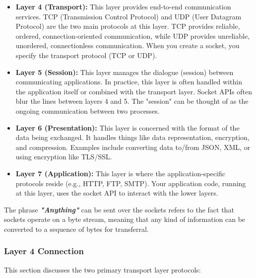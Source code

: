 \begin{itemize}
    \item \textbf{Layer 4 (Transport):}  This layer provides end-to-end communication services.  TCP (Transmission Control Protocol) and UDP (User Datagram Protocol) are the two main protocols at this layer. TCP provides reliable, ordered, connection-oriented communication, while UDP provides unreliable, unordered, connectionless communication. When you create a socket, you specify the transport protocol (TCP or UDP).
    \item \textbf{Layer 5 (Session):} This layer manages the dialogue (session) between communicating applications.  In practice, this layer is often handled within the application itself or combined with the transport layer. Socket APIs often blur the lines between layers 4 and 5.  The "session" can be thought of as the ongoing communication between two processes.
    \item \textbf{Layer 6 (Presentation):}  This layer is concerned with the format of the data being exchanged.  It handles things like data representation, encryption, and compression.  Examples include converting data to/from JSON, XML, or using encryption like TLS/SSL.
    \item \textbf{Layer 7 (Application):} This layer is where the application-specific protocols reside (e.g., HTTP, FTP, SMTP).  Your application code, running at this layer, uses the socket API to interact with the lower layers.
\end{itemize}
The phrase \textit{\textbf{"Anything"}} can be sent over the sockets refers to the fact that sockets operate on a byte stream, meaning that any kind of information can be converted to a sequence of bytes for transferral.

\subsubsection{Layer 4 Connection}
This section discusses the two primary transport layer protocols:

